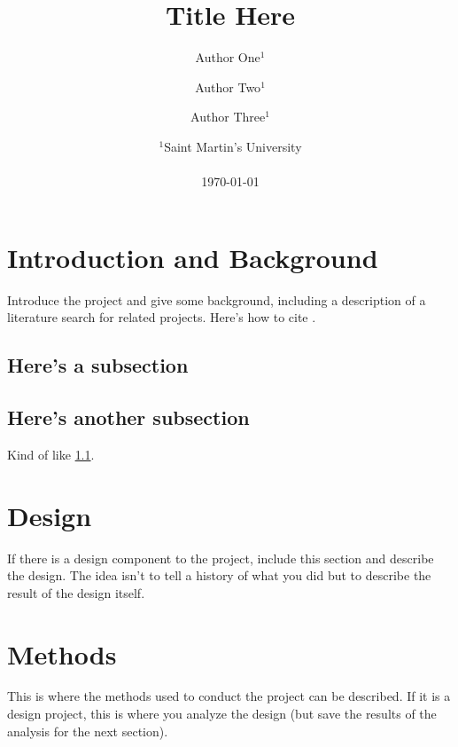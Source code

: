 \documentclass[letterpaper]{article}
\title{Title Here}
\author{%
	Author One$^1$%
	\and%
	Author Two$^1$%
	\and%
	Author Three$^1$%
}
\date{
	$^1$Saint Martin's University \\ %
	\texttt{%
	}\\[2ex]%
	\today
}
\begin{document}
\maketitle

\begin{abstract}
	\lipsum[1]

\end{abstract}

\tableofcontents

\section{Introduction and Background}
\label{sec:intro}

Introduce the project and give some background, including a description of a literature search for related projects. Here's how to cite \autocite[p.~23]{Russell2020}. 

\subsection{Here's a subsection}
\label{sec:subsection-label}

\lipsum[5]

\subsection{Here's another subsection}

Kind of like \cref{sec:subsection-label}.

\lipsum[5]

\section{Design}
\label{sec:design}

If there is a design component to the project, include this section and describe the design. The idea isn't to tell a history of what you did but to describe the result of the design itself.

\lipsum[4]

\section{Methods}
\label{sec:methods}

This is where the methods used to conduct the project can be described. If it is a design project, this is where you analyze the design (but save the results of the analysis for the next section).
\end{document}

